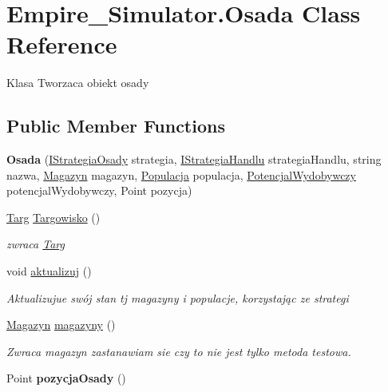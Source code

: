 \hypertarget{class_empire___simulator_1_1_osada}{\section{Empire\+\_\+\+Simulator.\+Osada Class Reference}
\label{class_empire___simulator_1_1_osada}
}


Klasa Tworzaca obiekt osady  


\subsection*{Public Member Functions}
\begin{DoxyCompactItemize}
\item 
\hypertarget{class_empire___simulator_1_1_osada_ab1adf9544300c191346c100fb52e65b2}{{\bfseries Osada} (\hyperlink{interface_empire___simulator_1_1_i_strategia_osady}{I\+Strategia\+Osady} strategia, \hyperlink{interface_empire___simulator_1_1_i_strategia_handlu}{I\+Strategia\+Handlu} strategia\+Handlu, string nazwa, \hyperlink{class_empire___simulator_1_1_magazyn}{Magazyn} magazyn, \hyperlink{class_empire___simulator_1_1_populacja}{Populacja} populacja, \hyperlink{class_empire___simulator_1_1_potencjal_wydobywczy}{Potencjal\+Wydobywczy} potencjal\+Wydobywczy, Point pozycja)}\label{class_empire___simulator_1_1_osada_ab1adf9544300c191346c100fb52e65b2}

\item 
\hyperlink{class_empire___simulator_1_1_targ}{Targ} \hyperlink{class_empire___simulator_1_1_osada_a57b436a278a3003b0acbd1adf0bb425e}{Targowisko} ()
\begin{DoxyCompactList}\small\item\em zwraca \hyperlink{class_empire___simulator_1_1_targ}{Targ} \end{DoxyCompactList}\item 
void \hyperlink{class_empire___simulator_1_1_osada_a9c261a758d377f2a49fb1acd18df71ae}{aktualizuj} ()
\begin{DoxyCompactList}\small\item\em Aktualizujue swój stan tj magazyny i populacje, korzystając ze strategi \end{DoxyCompactList}\item 
\hyperlink{class_empire___simulator_1_1_magazyn}{Magazyn} \hyperlink{class_empire___simulator_1_1_osada_a781412cccc2c86c3ac33ad32384a40ee}{magazyny} ()
\begin{DoxyCompactList}\small\item\em Zwraca magazyn zastanawiam sie czy to nie jest tylko metoda testowa. \end{DoxyCompactList}\item 
\hypertarget{class_empire___simulator_1_1_osada_a3221155c2b3d083f01e6f4f2f0f2815c}{Point {\bfseries pozycja\+Osady} ()}\label{class_empire___simulator_1_1_osada_a3221155c2b3d083f01e6f4f2f0f2815c}


\end{DoxyCompactItemize}
